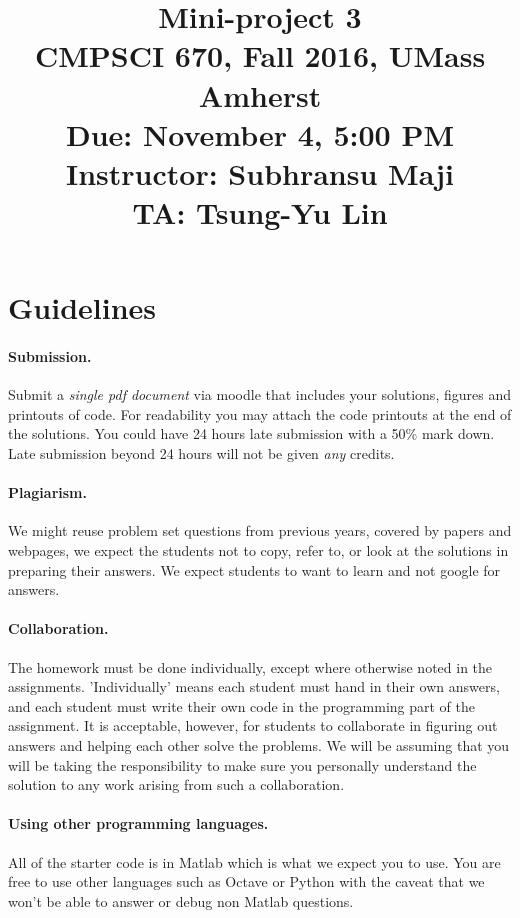 \documentclass[10pt,letterpaper]{article}
\title{
  \textbf{Mini-project 3} \\
  \Large{CMPSCI 670, Fall 2016, UMass Amherst} \\
  \Large{Due:  November 4, 5:00 PM } \\
  \Large{Instructor: Subhransu Maji} \\
  \Large{TA: Tsung-Yu Lin}
}
\date{}
\begin{document}
\maketitle

\renewcommand\thesubsection{\thesection.\alph{subsection}}


\section*{Guidelines}

\paragraph{Submission.} Submit a \emph{single pdf document} via moodle that includes your solutions, figures and printouts of code. For readability you may attach the code printouts at the end of the solutions. You could have 24 hours late submission with a 50\% mark down. Late submission beyond 24 hours will not be given \emph{any} credits. 

\paragraph{Plagiarism.} We might reuse problem set questions from previous years, covered by papers and webpages, we expect the students not to copy, refer to, or look at the solutions in preparing their answers. We expect students to want to learn and not google for answers. 

\paragraph{Collaboration.} The homework must be done individually, except where otherwise noted in the assignments. 'Individually' means each student must hand in their own answers, and each student must write their own code in the programming part of the assignment. It is acceptable, however, for students to collaborate in figuring out answers and helping each other solve the problems. We will be assuming that you will be taking the responsibility to make sure you personally understand the solution to any work arising from such a collaboration.

\paragraph{Using other programming languages.} All of the starter code is in Matlab which is what we expect you to use. You are free to use other languages such as Octave or Python with the caveat that we won't be able to answer or debug non Matlab questions.
\end{document}
